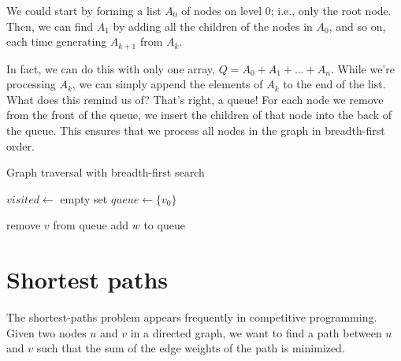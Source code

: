 We could start by forming a list $A_0$ of nodes on level 0; i.e., only the root node. Then, we can find $A_1$ by adding all the children of the nodes in $A_0$, and so on, each time generating $A_{k+1}$ from $A_k$.

In fact, we can do this with only one array, $Q = A_0 + A_1 + ... + A_n$. While we're processing $A_k$, we can simply append the elements of $A_k$ to the end of the list. What does this remind us of? That's right, a queue! For each node we remove from the front of the queue, we insert the children of that node into the back of the queue. This ensures that we process all nodes in the graph in breadth-first order.

\begin{algorithm}[H]
\caption{Graph traversal with breadth-first search}
\begin{algorithmic}

    \State $visited \gets$ empty set
    \State $queue \gets \{v_0\}$

        \State remove $v$ from queue
                \State add $w$ to queue
            \EndIf
        \EndFor
    \EndWhile
\EndFunction

\end{algorithmic}
\end{algorithm}


\section{Shortest paths}

The shortest-paths problem appears frequently in competitive programming. Given two nodes $u$ and $v$ in a directed graph, we want to find a path between $u$ and $v$ such that the sum of the edge weights of the path is minimized.

\begin{center}
\end{center}


